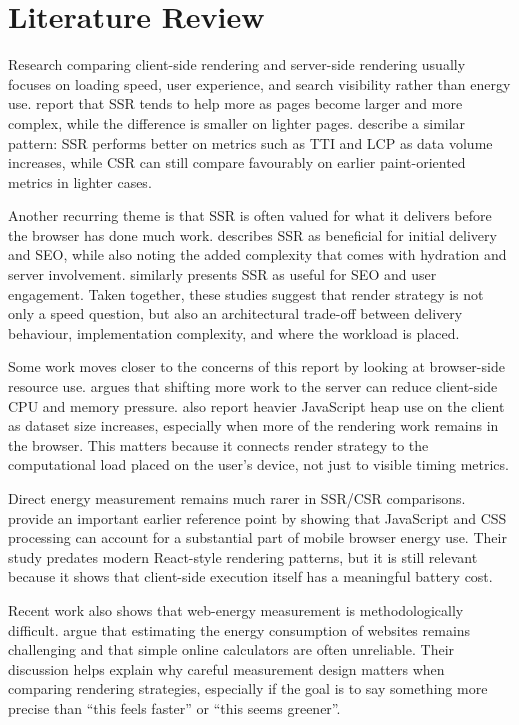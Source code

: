 \section{Literature Review}

Research comparing client-side rendering and server-side rendering usually focuses on loading speed, user experience, and search visibility rather than energy use. \citet{nordstrom2023} report that SSR tends to help more as pages become larger and more complex, while the difference is smaller on lighter pages. \citet{clapton2025} describe a similar pattern: SSR performs better on metrics such as TTI and LCP as data volume increases, while CSR can still compare favourably on earlier paint-oriented metrics in lighter cases.

Another recurring theme is that SSR is often valued for what it delivers before the browser has done much work. \citet{ojala2025} describes SSR as beneficial for initial delivery and SEO, while also noting the added complexity that comes with hydration and server involvement. \citet{gaddam2025} similarly presents SSR as useful for SEO and user engagement. Taken together, these studies suggest that render strategy is not only a speed question, but also an architectural trade-off between delivery behaviour, implementation complexity, and where the workload is placed.

Some work moves closer to the concerns of this report by looking at browser-side resource use. \citet{gaddam2025} argues that shifting more work to the server can reduce client-side CPU and memory pressure. \citet{clapton2025} also report heavier JavaScript heap use on the client as dataset size increases, especially when more of the rendering work remains in the browser. This matters because it connects render strategy to the computational load placed on the user's device, not just to visible timing metrics.

Direct energy measurement remains much rarer in SSR/CSR comparisons. \citet{thiagarajan2012} provide an important earlier reference point by showing that JavaScript and CSS processing can account for a substantial part of mobile browser energy use. Their study predates modern React-style rendering patterns, but it is still relevant because it shows that client-side execution itself has a meaningful battery cost.

Recent work also shows that web-energy measurement is methodologically difficult. \citet{kalliola2025} argue that estimating the energy consumption of websites remains challenging and that simple online calculators are often unreliable. Their discussion helps explain why careful measurement design matters when comparing rendering strategies, especially if the goal is to say something more precise than ``this feels faster'' or ``this seems greener''.

